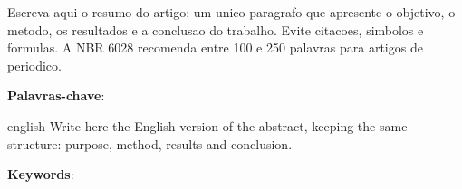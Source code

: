 
\begin{resumoumacoluna}
  Escreva aqui o resumo do artigo: um unico paragrafo que apresente o
  objetivo, o metodo, os resultados e a conclusao do trabalho. Evite
  citacoes, simbolos e formulas. A NBR 6028 recomenda entre 100 e 250
  palavras para artigos de periodico.

  \vspace{\onelineskip}
  \noindent
  \textbf{Palavras-chave}: \lkKeywords
\end{resumoumacoluna}

\begin{resumoumacoluna}[Abstract]
  \begin{otherlanguage*}{english}
    Write here the English version of the abstract, keeping the same
    structure: purpose, method, results and conclusion.

    \vspace{\onelineskip}
    \noindent
    \textbf{Keywords}: \lkKeywordsEn
  \end{otherlanguage*}
\end{resumoumacoluna}
